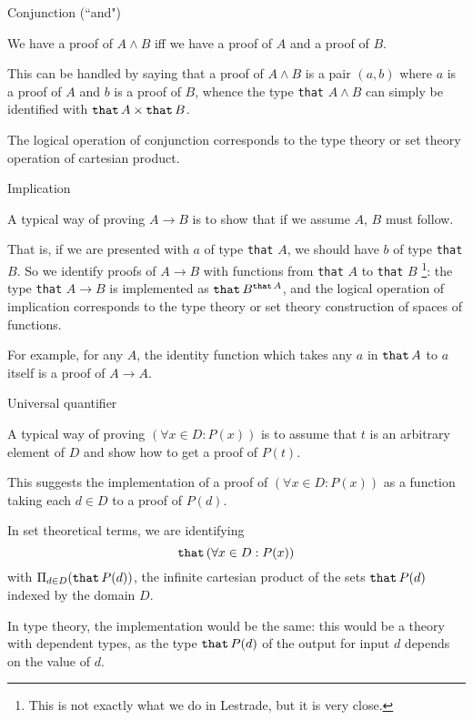 \documentclass{slides}
\begin{document}
\begin{slide}

{\Large Conjunction (``and")}

We have a proof of $A \wedge B$ iff we have a proof of $A$ and a proof of $B$.

This can be handled by saying that a proof of $A \wedge B$ is a pair $(a,b)$ where $a$ is a proof of $A$ and $b$ is a proof of $B$, whence the
type {\tt that} $A \wedge B$ can simply be identified with ${\tt that}\, A \times {\tt that}\, B$.

The logical operation of conjunction corresponds to the type theory or set theory operation of cartesian product.
\end{slide}

\begin{slide}

{\Large Implication}

A typical way of proving $A \rightarrow B$ is to show that if we assume $A$, $B$ must follow.

That is, if we are presented with $a$ of type {\tt that} $A$, we should have $b$ of type {\tt that} $B$.  So we identify proofs of $A \rightarrow B$ with functions
from {\tt that} $A$ to {\tt that} $B$ \footnote{This is not exactly what we do in Lestrade, but it is very close.}:  the type {\tt that} $A \rightarrow B$ is implemented as ${\tt that}\, B^{{\tt that}\, A}$, and the logical operation of implication corresponds to the type theory or set theory construction of spaces of functions.

For example, for any $A$, the identity function which takes any $a$ in ${\tt that}\,A$ to $a$ itself is a proof of $A \rightarrow A$.

\end{slide}

\begin{slide}

{\Large Universal quantifier}

A typical way of proving $(\forall x \in D:P(x))$ is to assume that $t$ is an arbitrary element of $D$ and show how to get a proof of $P(t)$.

This suggests the implementation of a proof of $(\forall x \in D:P(x))$ as a function taking each $d \in D$ to a proof of $P(d)$.

In set theoretical terms, we are identifying $${\tt that}\,(\forall x \in D:P(x))$$ with $\Pi_{d \in D} ({\tt that}\,P(d))$, the infinite cartesian product of the sets ${\tt that}\, P(d)$ indexed by the domain $D$.

In type theory, the implementation would be the same:  this would be a theory with dependent types, as the type ${\tt that}\,P(d)$ of the output for input $d$ depends on the value of $d$.

\end{slide}
\end{document}

